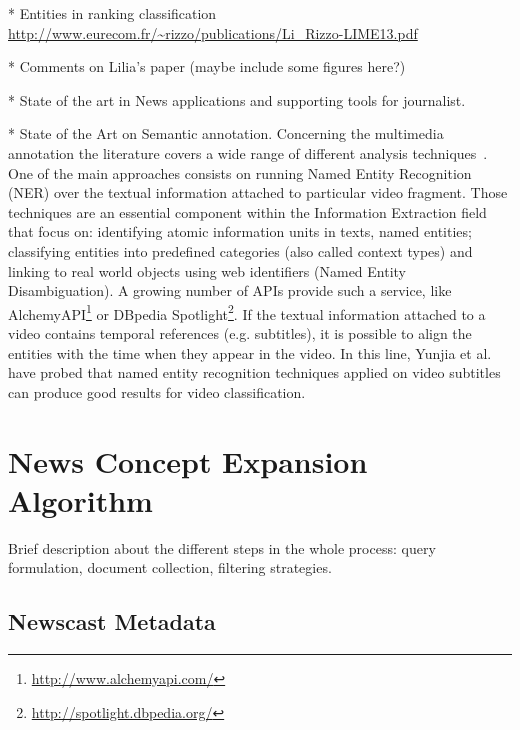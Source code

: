 \documentclass{llncs}
\begin{document}
* Entities in ranking classification
\url{http://www.eurecom.fr/~rizzo/publications/Li_Rizzo-LIME13.pdf}

* Comments on Lilia's paper (maybe include some figures here?)

* State of the art in News applications and supporting tools for journalist.

* State of the Art on Semantic annotation.
Concerning the multimedia annotation the literature covers a wide range of different analysis techniques~\cite{ballan2011event}. One of the main approaches consists on running Named Entity Recognition (NER) over the textual information attached to particular video fragment. Those techniques are an essential component within the Information Extraction field that focus on: identifying atomic information units in texts, named entities; classifying entities into predefined categories (also called context types) and linking to real world objects using web identifiers (Named Entity Disambiguation). A growing number of APIs provide such a service, like AlchemyAPI\footnote{\fontsize{8pt}{1em}\selectfont \url{http://www.alchemyapi.com/}} or DBpedia Spotlight\footnote{\fontsize{8pt}{1em}\selectfont \url{http://spotlight.dbpedia.org/}}. If the textual information attached to a video contains temporal references (e.g. subtitles), it is possible to align the entities with the time when they appear in the video. In this line, Yunjia et al.~\cite{yunjia2013} have probed that named entity recognition techniques applied on video subtitles can produce good results for video classification. 

\section{News Concept Expansion Algorithm}
\label{sec:ConceptExpansion}

Brief description about the different steps in the whole process: query formulation, document collection, filtering strategies.

\subsection{Newscast Metadata}
\end{document}
